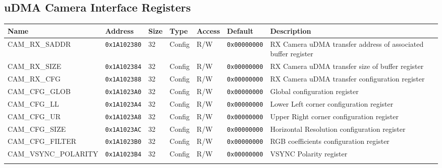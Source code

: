 
\subsection{uDMA Camera Interface Registers}
{\small
\begin{tabularx}{\textwidth}{|l|l|l|l|l|l|X|}
  \hline
  \textbf{Name} & \textbf{Address}  & \textbf{Size} & \textbf{Type} & \textbf{Access} & \textbf{Default} & \textbf{Description} \\
  \hline
  CAM\_RX\_SADDR & \texttt{0x1A102380} & 32 & Config & R/W & \texttt{0x00000000} & RX Camera uDMA transfer address of associated buffer register\\
  \hline
  CAM\_RX\_SIZE & \texttt{0x1A102384} & 32 & Config & R/W & \texttt{0x00000000} & RX Camera uDMA transfer size of buffer register\\
  \hline
  CAM\_RX\_CFG & \texttt{0x1A102388} & 32 & Config & R/W & \texttt{0x00000000} & RX Camera uDMA transfer configuration register\\
  \hline
  CAM\_CFG\_GLOB & \texttt{0x1A1023A0} & 32 & Config & R/W & \texttt{0x00000000} & Global configuration register\\
  \hline
  CAM\_CFG\_LL & \texttt{0x1A1023A4} & 32 & Config & R/W & \texttt{0x00000000} & Lower Left corner configuration register\\
  \hline
  CAM\_CFG\_UR & \texttt{0x1A1023A8} & 32 & Config & R/W & \texttt{0x00000000} & Upper Right corner configuration register\\
  \hline
  CAM\_CFG\_SIZE & \texttt{0x1A1023AC} & 32 & Config & R/W & \texttt{0x00000000} & Horizontal Resolution configuration register\\
  \hline
  CAM\_CFG\_FILTER & \texttt{0x1A1023B0} & 32 & Config & R/W & \texttt{0x00000000} & RGB coefficients configuration register\\
  \hline
  CAM\_VSYNC\_POLARITY & \texttt{0x1A1023B4} & 32 & Config & R/W & \texttt{0x00000000} & VSYNC Polarity register\\
  \hline
  \caption{uDMA Camera Interface}
\end{tabularx}
}




